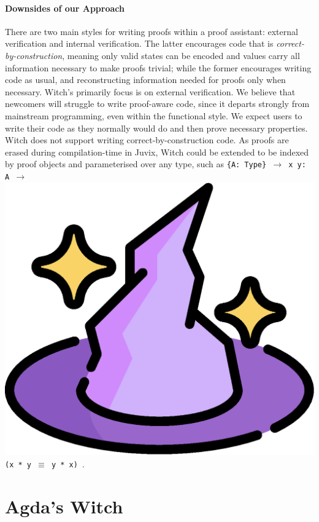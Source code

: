 \documentclass[sigconfl]{acmart}
\begin{document}
\paragraph{Downsides of our Approach}
There are two main styles for writing proofs within a proof assistant: external
verification and internal verification. The latter encourages code
that is \textit{correct-by-construction}, meaning only valid states can be
encoded and values carry all information necessary to make proofs trivial; while
the former encourages writing code as usual, and reconstructing information
needed for proofs only when necessary.
Witch's primarily focus is on external verification. We believe that newcomers
will struggle to write proof-aware code, since it departs strongly from
mainstream programming, even within the functional style. We expect users to
write their code as they normally would do and then prove necessary properties.
Witch does not support writing correct-by-construction code. As proofs
are erased during compilation-time in Juvix, Witch could be extended
to be indexed by proof objects and parameterised over any type, such as
\texttt{\{A: Type\} $\rightarrow$ x y: A $\rightarrow$ }
\includegraphics[height=0.02\textheight]{image/hat.eps} \texttt{ (x * y $\equiv$
  y * x) }.


\section{Agda's Witch} \label{witch-agda}
\end{document}

